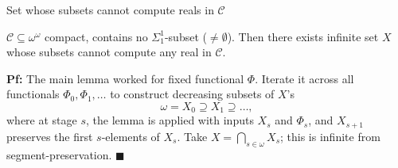 \begin{frame}{Set whose subsets cannot compute reals in $\mathcal{C}$}
  \begin{main-thm*}
    $\mathcal{C}\subseteq\omega^\omega$ compact, contains no
    $\Sigma_1^1$-subset ($\neq\emptyset$). Then there exists infinite set
    $X$ whose subsets cannot compute any real in $\mathcal{C}$.
  \end{main-thm*}

  \vspace{1em}
  \textbf{Pf:} The main lemma worked for fixed functional $\Phi$. Iterate
  it across all functionals $\Phi_0,\Phi_1,\ldots$ to construct decreasing
  subsets of $X$'s
  \[\omega= X_0\supseteq X_1\supseteq\ldots,\]
  where at stage $s$, the lemma is applied with inputs $X_s$ and
  $\Phi_s$, and $X_{s+1}$ preserves the first $s$-elements of $X_s$. Take
  $X=\bigcap_{s\in\omega}X_s$; this is infinite from segment-preservation.
  $\blacksquare$
\end{frame}
